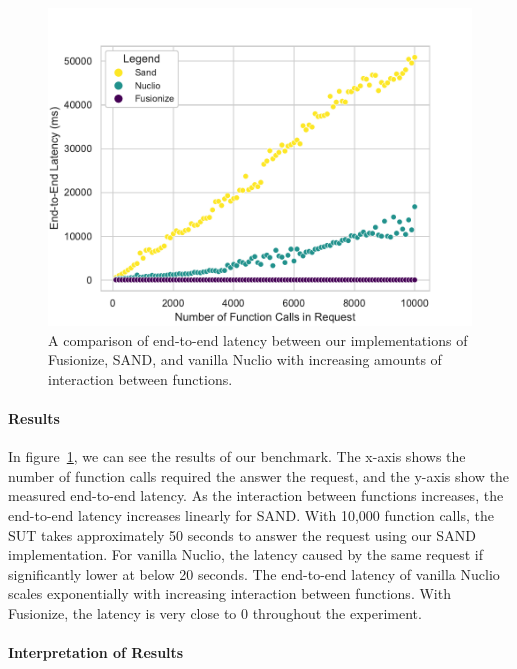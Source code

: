 \begin{figure}[!h]
    \centering
    \includegraphics[width=\linewidth]{figures/latency_sand_fusionize.pdf}
    \caption{
        A comparison of end-to-end latency between our implementations of Fusionize, SAND, and vanilla Nuclio with increasing amounts of interaction between functions.
    }\label{fig:sand_fusionize}
\end{figure}

\paragraph{Results}

In figure~\ref{fig:sand_fusionize}, we can see the results of our benchmark. 
The x-axis shows the number of function calls required the answer the request, and the y-axis show the measured end-to-end latency.
As the interaction between functions increases, the end-to-end latency increases linearly for SAND. 
With 10,000 function calls, the SUT takes approximately 50 seconds to answer the request using our SAND implementation.
For vanilla Nuclio, the latency caused by the same request if significantly lower at below 20 seconds.
The end-to-end latency of vanilla Nuclio scales exponentially with increasing interaction between functions.
With Fusionize, the latency is very close to 0 throughout the experiment.

\paragraph{Interpretation of Results}

